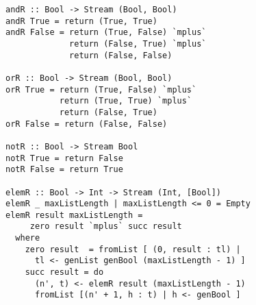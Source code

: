 \begin{figure}[!t]
  \centering
  \begin{minipage}{0.49\textwidth}
    \begin{lstlisting}[label={prop_helpers}, caption={Functions used in logic formulas generation}, captionpos=b, frame=tb]
andR :: Bool -> Stream (Bool, Bool)
andR True = return (True, True)
andR False = return (True, False) `mplus`
             return (False, True) `mplus`
             return (False, False)

orR :: Bool -> Stream (Bool, Bool)
orR True = return (True, False) `mplus`
           return (True, True) `mplus`
           return (False, True)
orR False = return (False, False)

notR :: Bool -> Stream Bool
notR True = return False
notR False = return True

elemR :: Bool -> Int -> Stream (Int, [Bool])
elemR _ maxListLength | maxListLength <= 0 = Empty
elemR result maxListLength =
     zero result `mplus` succ result
  where
    zero result  = fromList [ (0, result : tl) |
      tl <- genList genBool (maxListLength - 1) ]
    succ result = do
      (n', t) <- elemR result (maxListLength - 1)
      fromList [(n' + 1, h : t) | h <- genBool ]
    \end{lstlisting}
  \end{minipage}
\end{figure}


